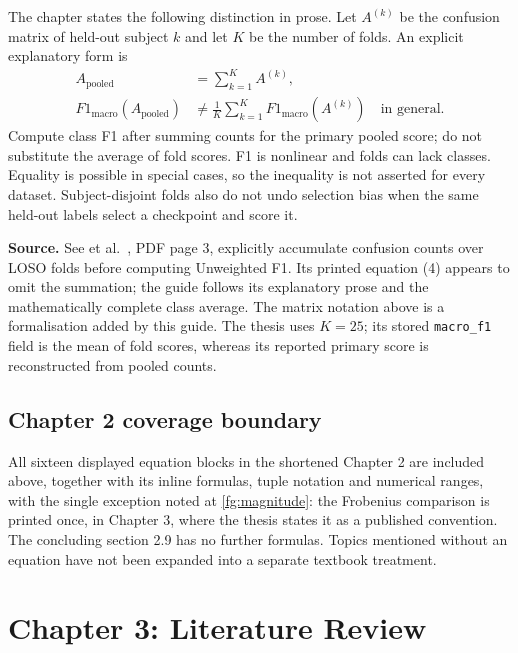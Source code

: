 \documentclass[11pt,a4paper]{article}
\numberwithin{equation}{section}
\begin{document}
The chapter states the following distinction in prose. Let $A^{(k)}$ be the
confusion matrix of held-out subject $k$ and let $K$ be the number of folds.
An explicit explanatory form is
\begin{equation}
\begin{aligned}
    A_{\mathrm{pooled}}&=\sum_{k=1}^{K}A^{(k)},\\
    F1_{\mathrm{macro}}(A_{\mathrm{pooled}})
       &\ne \frac1K\sum_{k=1}^{K}F1_{\mathrm{macro}}(A^{(k)})
       \quad\text{in general}.
\end{aligned}
    \label{fg:eq:pooling}
\end{equation}
Compute class F1 after summing counts for the primary pooled score; do not
substitute the average of fold scores. F1 is nonlinear and folds can lack
classes. Equality is possible in special cases, so the inequality is not
asserted for every dataset. Subject-disjoint folds also do not undo selection
bias when the same held-out labels select a checkpoint and score it.

\textbf{Source.} See et al.~\cite{see2019}, PDF page 3, explicitly accumulate
confusion counts over LOSO folds before computing Unweighted F1. Its printed
equation (4) appears to omit the summation; the guide follows its explanatory
prose and the mathematically complete class average. The matrix notation above
is a formalisation added by this guide. The thesis uses $K=25$; its stored
\texttt{macro\_f1} field is the mean of fold scores, whereas its reported
primary score is reconstructed from pooled counts.

\subsection{Chapter 2 coverage boundary}
All sixteen displayed equation blocks in the shortened Chapter 2 are included
above, together with its inline formulas, tuple notation and numerical ranges,
with the single exception noted at \autoref{fg:magnitude}: the Frobenius
comparison is printed once, in Chapter 3, where the thesis states it as a
published convention. The concluding section 2.9 has no further formulas.
Topics mentioned without an equation have not been expanded into a separate
textbook treatment.

\section{Chapter 3: Literature Review}
\label{fg:chapter3}
\end{document}

